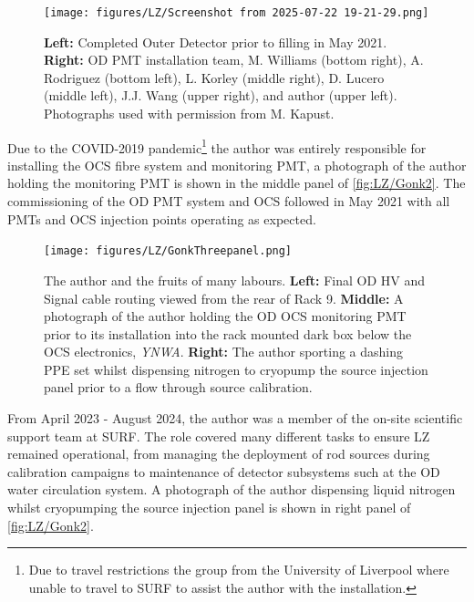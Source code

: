 \begin{figure}[ht!]
    \centering
    \texttt{[image: figures/LZ/Screenshot from 2025-07-22 19-21-29.png]}
    \caption[Completed Outer Detector prior to filling in May 2021 alongside OD PMT installation team.]{\textbf{Left:} Completed Outer Detector prior to filling in May 2021. \textbf{Right:} OD PMT installation team, M. Williams (bottom right), A. Rodriguez (bottom left), L. Korley (middle right), D. Lucero (middle left), J.J. Wang (upper right), and author (upper left). Photographs used with permission from M. Kapust.}
    \label{fig:LZ/ODImg}
\end{figure}

Due to the COVID-2019 pandemic\footnote{Due to travel restrictions the group from the University of Liverpool where unable to travel to SURF to assist the author with the installation.} the author was entirely responsible for installing the OCS fibre system and monitoring PMT, a photograph of the author holding the monitoring PMT is shown in the middle panel of \autoref{fig:LZ/Gonk2}. The commissioning of the OD PMT system and OCS followed in May 2021 with all PMTs and OCS injection points operating as expected.

\begin{figure}[ht!]
    \centering
    \texttt{[image: figures/LZ/GonkThreepanel.png]}
    \caption{The author and the fruits of many labours. \textbf{Left:} Final OD HV and Signal cable routing viewed from the rear of Rack 9. \textbf{Middle:} A photograph of the author holding the OD OCS monitoring PMT prior to its installation into the rack mounted dark box below the OCS electronics, \textit{YNWA}. \textbf{Right:} The author sporting a dashing PPE set whilst dispensing nitrogen to cryopump the source injection panel prior to a flow through source calibration.}
    \label{fig:LZ/Gonk2}
\end{figure}

From April 2023 - August 2024, the author was a member of the on-site scientific support team at SURF. The role covered many different tasks to ensure LZ remained operational, from managing the deployment of rod sources during calibration campaigns to maintenance of detector subsystems such at the OD water circulation system. A photograph of the author dispensing liquid nitrogen whilst cryopumping the source injection panel is shown in right panel of \autoref{fig:LZ/Gonk2}.

